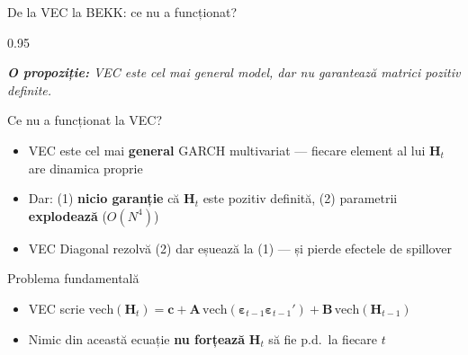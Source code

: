 \documentclass[9pt, aspectratio=169, t]{beamer}
\begin{document}
\begin{frame}{De la VEC la BEKK: ce nu a funcționat?}
    \begin{cminipage}{0.95\textwidth}
    {\footnotesize
    \textit{\textbf{O propoziție:} VEC este cel mai general model, dar nu garantează matrici pozitiv definite.}
    \vspace{0.2cm}
    \begin{block}{Ce nu a funcționat la VEC?}
        \begin{itemize}\setlength{\itemsep}{2pt}
            \item VEC este cel mai \textbf{general} GARCH multivariat --- fiecare element al lui $\mathbf{H}_t$ are dinamica proprie
            \item Dar: (1) \textbf{nicio garanție} că $\mathbf{H}_t$ este pozitiv definită, (2) parametrii \textbf{explodează} ($O(N^4)$)
            \item VEC Diagonal rezolvă (2) dar eșuează la (1) --- și pierde efectele de spillover
        \end{itemize}
    \end{block}
    \vspace{0.1cm}
    \begin{alertblock}{Problema fundamentală}
        \begin{itemize}\setlength{\itemsep}{0pt}
            \item VEC scrie $\text{vech}(\mathbf{H}_t) = \mathbf{c} + \mathbf{A}\,\text{vech}(\boldsymbol{\varepsilon}_{t-1}\boldsymbol{\varepsilon}_{t-1}') + \mathbf{B}\,\text{vech}(\mathbf{H}_{t-1})$
            \item Nimic din această ecuație \textbf{nu forțează} $\mathbf{H}_t$ să fie p.d.\ la fiecare $t$
        \end{itemize}
    \end{alertblock}
    }
    \end{cminipage}
\end{frame}
\end{document}
